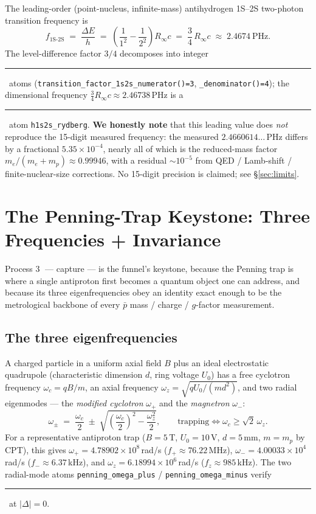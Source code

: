 \documentclass[11pt,a4paper]{article}
\newcommand{\tierdisc}[1]{\textcolor{#1}{\rule[0.05ex]{1.0ex}{1.0ex}}}
\newcommand{\tierBlue}{\tierdisc{blue!70!black}}
\newcommand{\tierGreen}{\tierdisc{green!60!black}}
\begin{document}
The leading-order (point-nucleus, infinite-mass) antihydrogen 1S--2S
two-photon transition frequency is
\begin{equation}
f_{\mathrm{1S\text{-}2S}}
\;=\; \frac{\Delta E}{h}
\;=\; \left(\frac{1}{1^2}-\frac{1}{2^2}\right) R_\infty c
\;=\; \frac{3}{4}\,R_\infty c
\;\approx\; 2.4674\ \mathrm{PHz}.
\label{eq:1s2s}
\end{equation}
The level-difference factor $3/4$ decomposes into integer
\tierBlue\ atoms (\verb|transition_factor_1s2s_numerator()=3|,
\verb|_denominator()=4|); the dimensional frequency
$\tfrac34 R_\infty c \approx 2.46738$\,PHz is a \tierGreen\ atom
\verb|h1s2s_rydberg|. \textbf{We honestly note} that this leading value does
\emph{not} reproduce the 15-digit measured frequency: the measured
$2.4660614\ldots$\,PHz differs by a fractional $5.35\!\times\!10^{-4}$,
nearly all of which is the reduced-mass factor $m_e/(m_e+m_p)\approx0.99946$,
with a residual $\sim\!10^{-5}$ from QED / Lamb-shift / finite-nuclear-size
corrections. No 15-digit precision is claimed; see \S\ref{sec:limits}.

\section{The Penning-Trap Keystone: Three Frequencies + Invariance}
\label{sec:keystone}

Process \textcircled{\scriptsize 3} --- capture --- is the funnel's
keystone, because the Penning trap is where a single antiproton first
becomes a quantum object one can address, and because its three
eigenfrequencies obey an identity exact enough to be the metrological
backbone of every $\bar p$ mass / charge / $g$-factor measurement.

\subsection{The three eigenfrequencies}

A charged particle in a uniform axial field $B$ plus an ideal electrostatic
quadrupole (characteristic dimension $d$, ring voltage $U_0$) has a free
cyclotron frequency $\omega_c = qB/m$, an axial frequency
$\omega_z=\sqrt{qU_0/(md^2)}$, and two radial eigenmodes --- the
\emph{modified cyclotron} $\omega_+$ and the \emph{magnetron} $\omega_-$:
\begin{equation}
\omega_\pm \;=\; \frac{\omega_c}{2} \;\pm\; \sqrt{\left(\frac{\omega_c}{2}\right)^{2} - \frac{\omega_z^2}{2}},
\qquad
\text{trapping}\iff \omega_c \ge \sqrt{2}\,\omega_z .
\label{eq:penning}
\end{equation}
For a representative antiproton trap ($B=5$\,T, $U_0=10$\,V, $d=5$\,mm,
$m=m_p$ by CPT), this gives $\omega_+ = 4.78902\!\times\!10^{8}$\,rad/s
($f_+\approx76.22$\,MHz), $\omega_- = 4.00033\!\times\!10^{4}$\,rad/s
($f_-\approx6.37$\,kHz), and $\omega_z=6.18994\!\times\!10^{6}$\,rad/s
($f_z\approx985$\,kHz). The two radial-mode atoms
\verb|penning_omega_plus| / \verb|penning_omega_minus| verify
\tierGreen\ at $|\Delta|=0$.
\end{document}
